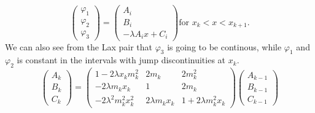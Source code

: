 \documentclass[english,master]{liumaiex}
\theoremstyle{plain}
\theoremstyle{definition}
\begin{document}
\begin{equation}
\begin{pmatrix} \varphi_1 \\ \varphi_2 \\ \varphi_3 \end{pmatrix} =
\begin{pmatrix} A_i \\ B_i \\ -\lambda A_i x + C_i \end{pmatrix} 
\text{for } x_k < x < x_{k+1}.
\end{equation}
We can also see from the Lax pair that $\varphi_3$ is going to be continous, while $\varphi_1$ and $\varphi_2$ is constant in the intervals with jump discontinuities at $x_k$.
\begin{equation}
\begin{pmatrix} A_k \\ B_k \\ C_k \end{pmatrix} = 
\begin{pmatrix}
	1 - 2\lambda x_k m_k^2 & 2m_k & 2m_k^2 \\
	-2\lambda m_k x_k & 1 & 2m_k \\
	-2\lambda^2 m_k^2 x_k^2 & 2\lambda m_k x_k & 1 + 2\lambda m_k^2 x_k
\end{pmatrix}
\begin{pmatrix} A_{k-1} \\ B_{k-1} \\ C_{k-1} \end{pmatrix}
\end{equation}
\end{document}
